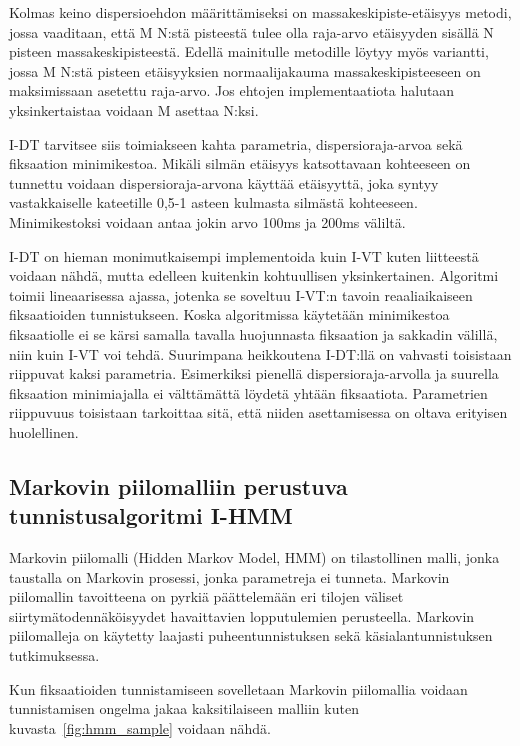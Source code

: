 Kolmas keino dispersioehdon määrittämiseksi on massakeskipiste-etäisyys metodi, jossa vaaditaan, että M N:stä pisteestä tulee olla raja-arvo etäisyyden sisällä N pisteen massakeskipisteestä. Edellä mainitulle metodille löytyy myös variantti, jossa M N:stä pisteen etäisyyksien normaalijakauma massakeskipisteeseen on maksimissaan asetettu raja-arvo. Jos ehtojen implementaatiota halutaan yksinkertaistaa voidaan M asettaa N:ksi. \citep[s.111] {shic2008}

I-DT tarvitsee siis toimiakseen kahta parametria, dispersioraja-arvoa sekä fiksaation minimikestoa. Mikäli silmän etäisyys katsottavaan kohteeseen on tunnettu voidaan dispersioraja-arvona käyttää etäisyyttä, joka syntyy vastakkaiselle kateetille 0,5-1 asteen kulmasta silmästä kohteeseen. Minimikestoksi voidaan antaa jokin arvo 100ms ja 200ms väliltä. \citep[s. 74]{salvucci2000}

I-DT on hieman monimutkaisempi implementoida kuin I-VT kuten liitteestä \emph{} voidaan nähdä, mutta edelleen kuitenkin kohtuullisen yksinkertainen. Algoritmi toimii lineaarisessa ajassa, jotenka se soveltuu I-VT:n tavoin reaaliaikaiseen fiksaatioiden tunnistukseen. Koska algoritmissa käytetään minimikestoa fiksaatiolle ei se kärsi samalla tavalla huojunnasta fiksaation ja sakkadin välillä, niin kuin I-VT voi tehdä. Suurimpana heikkoutena I-DT:llä on vahvasti toisistaan riippuvat kaksi parametria. Esimerkiksi pienellä dispersioraja-arvolla ja suurella fiksaation minimiajalla ei välttämättä löydetä yhtään fiksaatiota. Parametrien riippuvuus toisistaan tarkoittaa sitä, että niiden asettamisessa on oltava erityisen huolellinen.


\subsection{Markovin piilomalliin perustuva tunnistusalgoritmi I-HMM}

Markovin piilomalli (Hidden Markov Model, HMM) on tilastollinen malli, jonka taustalla on Markovin prosessi, jonka parametreja ei tunneta. Markovin piilomallin tavoitteena on pyrkiä päättelemään eri tilojen väliset siirtymätodennäköisyydet havaittavien lopputulemien perusteella. Markovin piilomalleja on käytetty laajasti puheentunnistuksen sekä käsialantunnistuksen tutkimuksessa.\citep[s. 257-286]{rabiner1989tutorial}

Kun fiksaatioiden tunnistamiseen sovelletaan Markovin piilomallia voidaan tunnistamisen ongelma jakaa kaksitilaiseen malliin kuten kuvasta~\ref{fig:hmm_sample} voidaan nähdä. 

